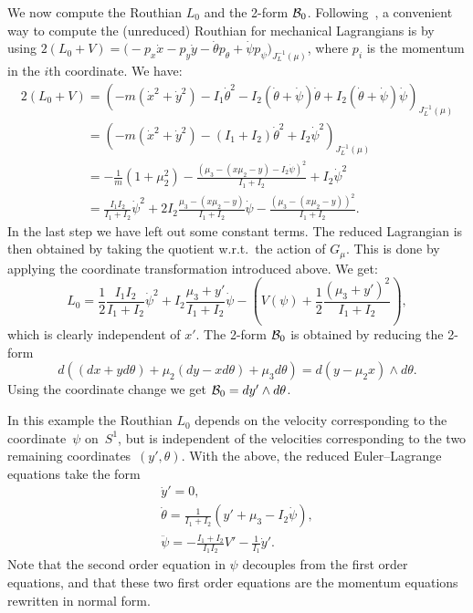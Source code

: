 \documentclass[pdftex]{sigma}
\newcommand{\B}{{\cal B}}
\begin{document}
We now compute the Routhian $L_0$ and the 2-form $\B_0$. Following~\cite{pars}, a convenient way to compute the (unreduced) Routhian for mechanical Lagrangians is by using $2( L_0 +V)=\big(-p_x\dot x -p_y\dot y - \dot \theta p_\theta + \dot \psi p_\psi\big)_{J^{-1}_L(\mu)}$, where $p_i$ is the momentum in the $i$th coordinate. We have:
\begin{gather*}
 2( L_0 +V)  = \left(-m ({\dot x}^2 + {\dot y}^2) -I_1 {\dot\theta}^2 -
 I_2 (\dot\theta+\dot\psi)\dot\theta  +I_2(\dot \theta+\dot\psi)\dot\psi\right)_{J^{-1}_L(\mu)}  \\
 \phantom{2( L_0 +V)}{}
 =  \left(-m ({\dot x}^2 + {\dot y}^2) -(I_1+I_2) {\dot\theta}^2 +I_2\dot\psi^2\right)_{J^{-1}_L(\mu)} \\
 \phantom{2( L_0 +V)}{}= - \frac{1}{m}(1+ \mu_2^2) -\frac{\left(\mu_3 -(x\mu_2-y) -I_2\dot\psi\right)^2}{I_1+I_2} +
I_2\dot\psi^2\\
\phantom{2( L_0 +V)}{}
=  \frac{I_1I_2}{I_1+I_2}\dot\psi^2 +2I_2\frac{\mu_3-(x\mu_2-y)}{I_1+I_2}\dot\psi - \frac{\left(\mu_3 -(x\mu_2-y)\right)^2}{I_1+I_2}.
\end{gather*}
In the last step we have left out some constant terms. The reduced Lagrangian is then obtained by taking the quotient w.r.t.\ the action of $G_\mu$.  This is done by applying the coordinate transformation introduced above. We get:
 \[
 L_0 =\frac12 \frac{I_1I_2}{I_1+I_2}\dot\psi^2 +I_2\frac{\mu_3+y'}{I_1+I_2}\dot\psi - \left(V(\psi) +\frac12 \frac{\left(\mu_3 +y'\right)^2}{I_1+I_2}\right),
\]
which is clearly independent of $x'$.
The 2-form $\B_0$ is obtained by reducing the 2-form
\[ d\left((dx+yd\theta) + \mu_2(dy-xd\theta) +\mu_3d\theta\right)= d(y-\mu_2 x)\wedge d\theta.\]
Using the coordinate change  we get $\B_0=dy'\wedge d\theta$.

In this example the Routhian $L_0$ depends on the velocity corresponding to the coordinate~$\psi$ on~$S^1$, but is independent of the velocities corresponding to the two remaining coordinates~$(y',\theta)$. With the above, the reduced Euler--Lagrange equations take the form
\begin{gather*}
{\dot y}'  =  0,\\
{\dot\theta}   =  \frac{1}{I_1+I_2} (y'+\mu_3-I_2\dot\psi),  \\
{\ddot \psi} =  - \frac{I_1+I_2}{I_1I_2} V' - \frac{1}{I_1} \dot y'.
\end{gather*}
Note that the second order equation in $\psi$ decouples from the f\/irst order equations, and that these two f\/irst order equations are the momentum equations rewritten in normal form.
\end{document}
